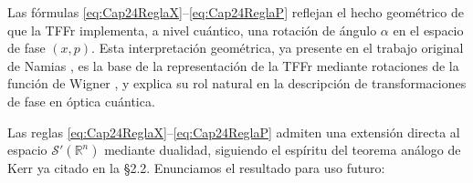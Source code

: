             \begin{remark}
                Las fórmulas \eqref{eq:Cap24ReglaX}--\eqref{eq:Cap24ReglaP} reflejan el hecho geométrico de que la TFFr implementa, a nivel cuántico, una rotación de ángulo $\alpha$ en el espacio de fase $(x, p)$. Esta interpretación geométrica, ya presente en el trabajo original de Namias \citep{namias1980fractional}, es la base de la representación de la TFFr mediante rotaciones de la función de Wigner \citep{mustard1996fractional,almeida1994fractional}, y explica su rol natural en la descripción de transformaciones de fase en óptica cuántica.
            \end{remark}


            Las reglas \eqref{eq:Cap24ReglaX}--\eqref{eq:Cap24ReglaP} admiten una extensión directa al espacio $\mathcal{S}'(\mathbb{R}^n)$ mediante dualidad, siguiendo el espíritu del teorema análogo de Kerr \citep{kerr1988distributional} ya citado en la §2.2. Enunciamos el resultado para uso futuro:

